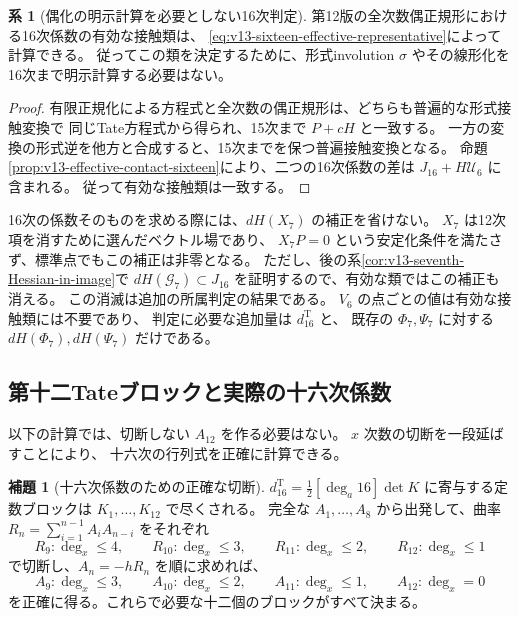 \documentclass[a4paper,11pt]{ltjsarticle}
\theoremstyle{definition}
\newtheorem{lemma}[theorem]{補題}
\newtheorem{corollary}[theorem]{系}
\begin{document}
\begin{corollary}[偶化の明示計算を必要としない16次判定]
\label{cor:v13-even-normalization-comparison}
第12版の全次数偶正規形における16次係数の有効な接触類は、
\eqref{eq:v13-sixteen-effective-representative}によって計算できる。
従ってこの類を決定するために、形式involution $\sigma$ やその線形化を
16次まで明示計算する必要はない。
\end{corollary}
\begin{proof}
有限正規化による方程式と全次数の偶正規形は、どちらも普遍的な形式接触変換で
同じTate方程式から得られ、15次まで $P+cH$ と一致する。
一方の変換の形式逆を他方と合成すると、15次までを保つ普遍接触変換となる。
命題\ref{prop:v13-effective-contact-sixteen}により、二つの16次係数の差は
$J_{16}+H\mathcal U_6$ に含まれる。
従って有効な接触類は一致する。
\end{proof}

16次の係数そのものを求める際には、$dH(X_7)$ の補正を省けない。
$X_7$ は12次項を消すために選んだベクトル場であり、
$X_7P=0$ という安定化条件を満たさず、標準点でもこの補正は非零となる。
ただし、後の系\ref{cor:v13-seventh-Hessian-in-image}で
$dH(\mathcal G_7)\subset J_{16}$ を証明するので、有効な類ではこの補正も消える。
この消滅は追加の所属判定の結果である。
$V_6$ の点ごとの値は有効な接触類には不要であり、
判定に必要な追加量は $d^{\mathrm T}_{16}$ と、
既存の $\Phi_7,\Psi_7$ に対する $dH(\Phi_7),dH(\Psi_7)$ だけである。

\subsection{第十二Tateブロックと実際の十六次係数}
\label{subsec:v13-actual-sixteenth}

以下の計算では、切断しない $A_{12}$ を作る必要はない。
$x$ 次数の切断を一段延ばすことにより、
十六次の行列式を正確に計算できる。

\begin{lemma}[十六次係数のための正確な切断]
\label{lem:v13-exact-twelfth-truncation}
$d^{\mathrm T}_{16}=\tfrac12[\deg_a16]\det K$ に寄与する定数ブロックは
$K_1,\ldots,K_{12}$ で尽くされる。
完全な $A_1,\ldots,A_8$ から出発して、曲率
$R_n=\sum_{i=1}^{n-1}A_iA_{n-i}$ をそれぞれ
\[
 R_9:\deg_x\le4,\qquad
 R_{10}:\deg_x\le3,\qquad
 R_{11}:\deg_x\le2,\qquad
 R_{12}:\deg_x\le1
\]
で切断し、$A_n=-hR_n$ を順に求めれば、
\[
 A_9:\deg_x\le3,\qquad
 A_{10}:\deg_x\le2,\qquad
 A_{11}:\deg_x\le1,\qquad
 A_{12}:\deg_x=0
\]
を正確に得る。これらで必要な十二個のブロックがすべて決まる。
\end{lemma}
\end{document}
